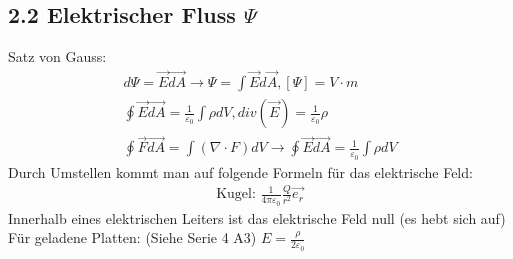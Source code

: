 \subsection*{2.2 Elektrischer Fluss $\Psi$}
    Satz von Gauss:
    \begin{align*}
        d\Psi = \overrightarrow{E} \overrightarrow{dA} \rightarrow \Psi = \int \overrightarrow{E} d \overrightarrow{A}, [\Psi] = V \cdot m \\
        \oint \overrightarrow{E} \overrightarrow{dA} = \frac{1}{\varepsilon_0} \int \rho dV , div(\overrightarrow{E}) = \frac{1}{\varepsilon_0} \rho\\
        \oint \overrightarrow{F} \overrightarrow{dA} = \int (\nabla \cdot F) dV \rightarrow \oint \overrightarrow{E} \overrightarrow{dA} = \frac{1}{\varepsilon_0} \int \rho dV
    \end{align*}
    Durch Umstellen kommt man auf folgende Formeln für das elektrische Feld:
    \begin{align*}
        \text{Kugel: } \frac{1}{4 \pi \varepsilon_0}\frac{Q}{r^2} \overrightarrow{e_r}
    \end{align*}
    Innerhalb eines elektrischen Leiters ist das elektrische Feld null (es hebt sich auf)\\
    Für geladene Platten: (Siehe Serie 4 A3) $E = \frac{\rho}{2 \varepsilon_0}$